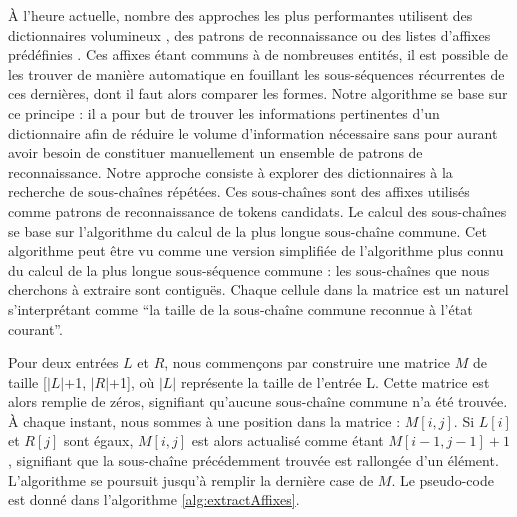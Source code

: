 \documentclass[PhD-Yoann-Dupont.tex]{subfiles}
\begin{document}
À l'heure actuelle, nombre des approches les plus performantes utilisent des dictionnaires volumineux \citep{leaman2013ncbi,lowe2014leadmine,chiu2015named}, des patrons de reconnaissance \citep{campos2013chemical,holat2016fouille} ou des listes d'affixes prédéfinies \citep{leaman2013ncbi}. Ces affixes étant communs à de nombreuses entités, il est possible de les trouver de manière automatique en fouillant les sous-séquences récurrentes de ces dernières, dont il faut alors comparer les formes. Notre algorithme se base sur ce principe : il a pour but de trouver les informations pertinentes d'un dictionnaire afin de réduire le volume d'information nécessaire sans pour aurant avoir besoin de constituer manuellement un ensemble de patrons de reconnaissance. Notre approche consiste à explorer des dictionnaires à la recherche de sous-chaînes répétées. Ces sous-chaînes sont des affixes utilisés comme patrons de reconnaissance de tokens candidats. Le calcul des sous-chaînes se base sur l'algorithme du calcul de la plus longue sous-chaîne commune. Cet algorithme peut être vu comme une version simplifiée de l'algorithme plus connu du calcul de la plus longue sous-séquence commune : les sous-chaînes que nous cherchons à extraire sont contiguës. Chaque cellule dans la matrice est un naturel s'interprétant comme ``la taille de la sous-chaîne commune reconnue à l'état courant''.

Pour deux entrées $L$ et $R$, nous commençons par construire une matrice $M$ de taille [$|L|$+1, $|R|$+1], où $|L|$ représente la taille de l'entrée L. Cette matrice est alors remplie de zéros, signifiant qu'aucune sous-chaîne commune n'a été trouvée. À chaque instant, nous sommes à une position dans la matrice : $M[i,j]$. Si $L[i]$ et $R[j]$ sont égaux, $M[i,j]$ est alors actualisé comme étant $M[i-1,j-1]+1$, signifiant que la sous-chaîne précédemment trouvée est rallongée d'un élément. L'algorithme se poursuit jusqu'à remplir la dernière case de $M$. Le pseudo-code est donné dans l'algorithme \ref{alg:extractAffixes}.
\end{document}
